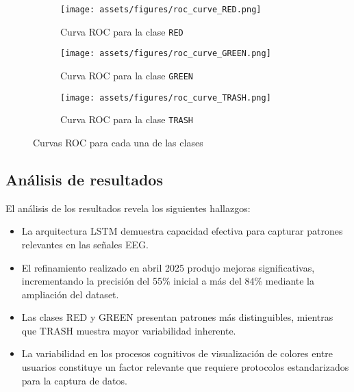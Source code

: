 \begin{figure}[ht]
    \centering
    \begin{subfigure}[b]{0.32\textwidth}
        \centering
        \texttt{[image: assets/figures/roc\_curve\_RED.png]}
        \caption{Curva ROC para la clase \texttt{RED}}
        \label{fig:roc_red}
    \end{subfigure}
    \hfill
    \begin{subfigure}[b]{0.32\textwidth}
        \centering
        \texttt{[image: assets/figures/roc\_curve\_GREEN.png]}
        \caption{Curva ROC para la clase \texttt{GREEN}}
        \label{fig:roc_green}
    \end{subfigure}
    \hfill
    \begin{subfigure}[b]{0.32\textwidth}
        \centering
        \texttt{[image: assets/figures/roc\_curve\_TRASH.png]}
        \caption{Curva ROC para la clase \texttt{TRASH}}
        \label{fig:roc_trash}
    \end{subfigure}
    \caption{Curvas ROC para cada una de las clases}
    \label{fig:roc_curves}
\end{figure}


\newpage
\subsection{Análisis de resultados}

El análisis de los resultados revela los siguientes hallazgos:

\begin{itemize}
    \item La arquitectura LSTM demuestra capacidad efectiva para capturar patrones relevantes en las señales EEG.
    
    \item El refinamiento realizado en abril 2025 produjo mejoras significativas, incrementando la precisión del 55\% inicial a más del 84\% mediante la ampliación del dataset.
    
    \item Las clases RED y GREEN presentan patrones más distinguibles, mientras que TRASH muestra mayor variabilidad inherente.
    
    \item La variabilidad en los procesos cognitivos de visualización de colores entre usuarios constituye un factor relevante que requiere protocolos estandarizados para la captura de datos.
\end{itemize}

